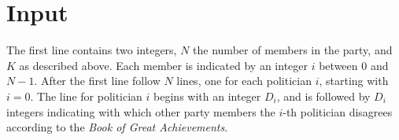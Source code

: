 %
%
%






\section*{Input}
The first line contains two integers,  $N$ the number of members in the party, and $K$ as described above. Each member is indicated by an integer $i$ between $0$ and $N-1$. After the first line follow $N$ lines, one for each politician $i$, starting with $i = 0$. The line for politician $i$ begins with an integer $D_i$, and is followed by $D_i$ integers indicating with which other party members the $i$-th politician disagrees according to the \emph{Book of Great Achievements}.

